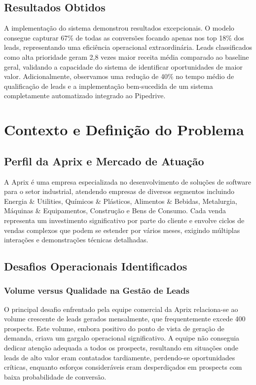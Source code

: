 \documentclass[portuguese,11pt]{article}
\begin{document}
\subsection*{Resultados Obtidos}
A implementação do sistema demonstrou resultados excepcionais. O modelo consegue capturar 67\% de todas as conversões focando apenas nos top 18\% dos leads, representando uma eficiência operacional extraordinária. Leads classificados como alta prioridade geram 2,8 vezes maior receita média comparado ao baseline geral, validando a capacidade do sistema de identificar oportunidades de maior valor. Adicionalmente, observamos uma redução de 40\% no tempo médio de qualificação de leads e a implementação bem-sucedida de um sistema completamente automatizado integrado ao Pipedrive.

\section{Contexto e Definição do Problema}

\subsection{Perfil da Aprix e Mercado de Atuação}
A Aprix é uma empresa especializada no desenvolvimento de soluções de software para o setor industrial, atendendo empresas de diversos segmentos incluindo Energia \& Utilities, Químicos \& Plásticos, Alimentos \& Bebidas, Metalurgia, Máquinas \& Equipamentos, Construção e Bens de Consumo. Cada venda representa um investimento significativo por parte do cliente e envolve ciclos de vendas complexos que podem se estender por vários meses, exigindo múltiplas interações e demonstrações técnicas detalhadas.

\subsection{Desafios Operacionais Identificados}

\subsubsection{Volume versus Qualidade na Gestão de Leads}
O principal desafio enfrentado pela equipe comercial da Aprix relaciona-se ao volume crescente de leads gerados mensalmente, que frequentemente excede 400 prospects. Este volume, embora positivo do ponto de vista de geração de demanda, criava um gargalo operacional significativo. A equipe não conseguia dedicar atenção adequada a todos os prospects, resultando em situações onde leads de alto valor eram contatados tardiamente, perdendo-se oportunidades críticas, enquanto esforços consideráveis eram desperdiçados em prospects com baixa probabilidade de conversão.
\end{document}
